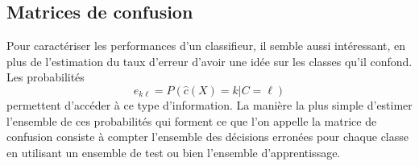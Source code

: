 \subsection{Matrices de confusion}

Pour caract\'eriser les performances d'un classifieur, il 
semble aussi int\'eressant, en plus de l'estimation du taux d'erreur
d'avoir une id\'ee sur les classes qu'il  confond. Les probabilit\'es 
$$
e_{k\ell}=P(\hat{c}(X)=k | C=\ell)
$$  
permettent d'acc\'eder \`a ce type d'information. La mani\`ere la plus
simple d'estimer l'ensemble de ces probabilit\'es qui forment ce que
l'on appelle la matrice de confusion consiste \`a compter l'ensemble 
des d\'ecisions erron\'ees pour chaque classe en utilisant un ensemble de test
ou bien l'ensemble d'apprentissage.

